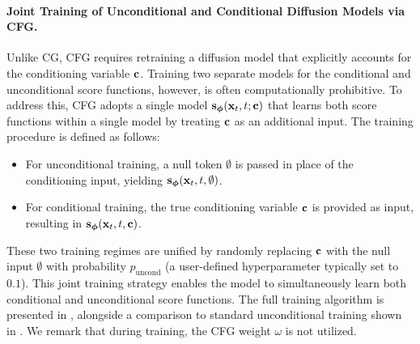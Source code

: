 \paragraph{Joint Training of Unconditional and Conditional Diffusion Models via CFG.} Unlike CG, CFG requires retraining a diffusion model that explicitly accounts for the conditioning variable ${\mathbf{c}}$. Training two separate models for the conditional and unconditional score functions, however, is often computationally prohibitive. To address this, CFG adopts a single model $\mathbf{s}_{\bm{\phi}}({\mathbf{x}}_t, t; {\mathbf{c}})$ that learns both score functions within a single model by treating ${\mathbf{c}}$ as an additional input. The training procedure is defined as follows:
\begin{itemize}
    \item For unconditional training, a null token $\emptyset$ is passed in place of the conditioning input, yielding ${\mathbf{s}}_{\bm{\phi}}({\mathbf{x}}_t, t, \emptyset)$.
    \item For conditional training, the true conditioning variable ${\mathbf{c}}$ is provided as input, resulting in ${\mathbf{s}}_{\bm{\phi}}({\mathbf{x}}_t, t, {\mathbf{c}})$.
\end{itemize}
These two training regimes are unified by randomly replacing ${\mathbf{c}}$ with the null input $\emptyset$ with probability $p_\mathrm{uncond}$ (a user-defined hyperparameter typically set to $0.1$). This joint training strategy enables the model to simultaneously learn both conditional and unconditional score functions. The full training algorithm is presented in , alongside a comparison to standard unconditional training shown in . We remark that during training, the CFG weight $\omega$ is not utilized.

